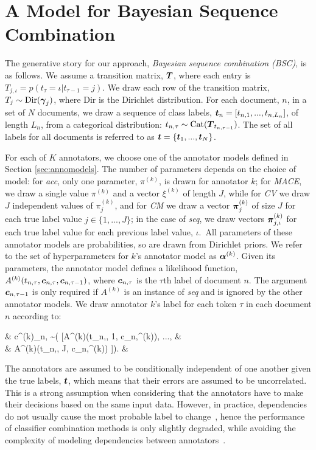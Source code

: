 \section{A Model for Bayesian Sequence Combination}\label{sec:model}
The generative story for our approach, \emph{Bayesian sequence combination (BSC)}, is as follows.
We assume a transition matrix, $\boldsymbol T$, where each entry is $T_{j,\iota} = p(t_{\tau} = \iota | t_{\tau-1} = j)$.
We draw each row of the transition matrix, $T_j \sim \mathrm{Dir}(\boldsymbol \gamma_j)$, where $\mathrm{Dir}$ is the Dirichlet distribution. 
For each document, $n$, in a set of $N$ documents, we draw a sequence of class labels, 
$\boldsymbol t_n = [t_{n,1}, ..., t_{n, L_n}]$, of length $L_n$, from a categorical distribution:
$t_{n,\tau} \sim \mathrm{Cat}(\boldsymbol T_{t_{n,\tau-1}})$. The set of all labels for all documents is referred to as $\boldsymbol t = \{\boldsymbol t_1,...,\boldsymbol t_N\}$.

For each of $K$ annotators, we choose one of the annotator 
models defined in Section \ref{sec:annomodels}.
The number of parameters depends on the choice of model:
for \emph{acc}, only one parameter, $\pi^{(k)}$, is drawn for annotator $k$;
for \emph{MACE}, we draw a single value $\pi^{(k)}$ and a vector $\xi^{(k)}$ of length $J$, 
while for \emph{CV} we draw $J$ independent values of $\pi_j^{(k)}$, 
and for \emph{CM}  
we draw a vector $\boldsymbol\pi^{(k)}_j$ of size $J$ for each true label value $j\in \{1,...,J\}$; in the case of \emph{seq}, 
we draw vectors $\boldsymbol\pi^{(k)}_{j,\iota}$ for each true label value 
for each previous label value, $\iota$.\
All parameters of these annotator models are probabilities, 
so are drawn from Dirichlet priors. We refer to the set of hyperparameters 
for $k$'s annotator model as $\boldsymbol\alpha^{(k)}$.
Given its parameters, the annotator model defines a likelihood function,
$A^{(k)}(t_{n,\tau}, \boldsymbol c_{n,\tau}, \boldsymbol c_{n,\tau-1})$, where $\boldsymbol c_{n,\tau}$ is the $\tau$th label of document $n$.
The argument $\boldsymbol c_{n,\tau-1}$ is only required if $A^{(k)}$ is an instance
of \emph{seq} and is ignored by the other annotator models.
We draw annotator $k$'s label for each token $\tau$ in each document $n$ 
according to:
\begin{flalign}
& c^{(k)}_{n,\tau} \sim {}( [A^{(k)}(t_{n,\tau}, 1, \bs c_{n,}^{(k)}), ..., & \nonumber \\
& \hspace{3cm} A^{(k)}(t_{n,\tau}, J, \bs c_{n,\tau-1}^{(k)}) ]). &
\end{flalign}
The annotators are assumed to be conditionally independent of one another given the true labels,
$\boldsymbol t$, which means that their errors are assumed to be uncorrelated. This is a strong assumption
when considering that the annotators have to make their decisions based
on the same input data. However, in practice, dependencies do not usually cause the 
most probable label to change~\citep{zhang2004optimality}, hence the performance of classifier combination methods 
is only slightly degraded, while avoiding the complexity of modeling dependencies between annotators~\citep{kim2012bayesian}.

